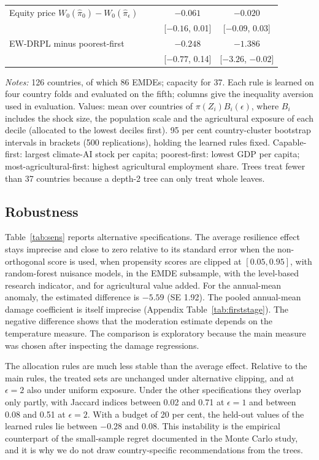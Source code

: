 \begin{table}[t]
\begin{tabular}{lcccc}
Equity price $W_0(\hat\pi_0)-W_0(\hat\pi_\epsilon)$ & & & $-0.061$ & $-0.020$ \\
 & & & {\footnotesize[$-0.16$, 0.01]} & {\footnotesize[$-0.09$, 0.03]} \\
EW-DRPL minus poorest-first & & & $-0.248$ & $-1.386$ \\
 & & & {\footnotesize[$-0.77$, 0.14]} & {\footnotesize[$-3.26$, $-0.02$]} \\
\bottomrule
\end{tabular}
\begin{minipage}{0.95\textwidth}\footnotesize\smallskip
\emph{Notes:} 126 countries, of which 86 EMDEs; capacity for 37. Each rule is learned on four
country folds and evaluated on the fifth; columns give the inequality aversion used in evaluation.
Values: mean over countries of $\pi(Z_i)B_i(\epsilon)$, where $B_i$ includes the shock size, the
population scale and the agricultural exposure of each decile (allocated to the lowest deciles
first). 95 per cent country-cluster bootstrap intervals in brackets (500 replications), holding the
learned rules fixed. Capable-first: largest climate-AI stock per capita; poorest-first: lowest GDP
per capita; most-agricultural-first: highest agricultural employment share. Trees treat fewer than
37 countries because a depth-2 tree can only treat whole leaves.
\end{minipage}
\end{table}

\subsection{Robustness}\label{sec:robust}

Table~\ref{tab:sens} reports alternative specifications. The average resilience effect stays
imprecise and close to zero relative to its standard error when the non-orthogonal score is used,
when propensity scores are clipped at $[0.05,0.95]$, with random-forest nuisance models, in the EMDE
subsample, with the level-based research indicator, and for agricultural value
added. For the annual-mean anomaly, the estimated difference is $-5.59$ (SE 1.92). The
pooled annual-mean damage coefficient is itself imprecise (Appendix Table~\ref{tab:firststage}).
The negative difference shows that the moderation estimate depends on the temperature
measure. The comparison is exploratory because the main measure was chosen after
inspecting the damage regressions.

The allocation rules are much less stable than the average effect. Relative to the main rules, the
treated sets are unchanged under alternative clipping, and at $\epsilon=2$ also under uniform
exposure. Under the other specifications they overlap only partly, with Jaccard indices between
0.02 and 0.71 at $\epsilon=1$ and between 0.08 and 0.51 at $\epsilon=2$. With a budget of 20 per
cent, the held-out values of the learned rules lie between $-0.28$ and 0.08. This instability is the empirical
counterpart of the small-sample regret documented in the Monte Carlo study, and it is why we do not
draw country-specific recommendations from the trees.


